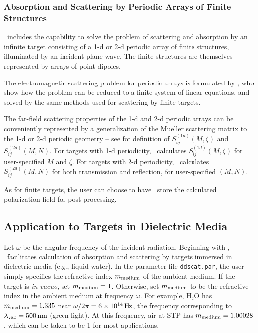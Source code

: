 {%

\subsubsection{ Absorption and Scattering by Periodic Arrays of Finite 
               Structures}

\ddscatv\ includes the capability to solve the problem of scattering and 
absorption by an infinite target consisting of a 1-d or 2-d periodic array of 
finite structures, illuminated by an incident plane wave.  
The finite structures are themselves represented by arrays of point dipoles.

The electromagnetic scattering problem for periodic arrays is formulated by 
\citet{Draine+Flatau_2008a}, 
who show how the problem can be reduced to a finite system of linear 
equations, and solved by the same methods used for scattering by finite 
targets.

The far-field scattering properties of the 1-d and 2-d periodic arrays can be
conveniently represented by a generalization of the Mueller scattering matrix 
to the 1-d or 2-d periodic geometry -- see \citet{Draine+Flatau_2008a} for 
definition of $S_{ij}^{(1d)}(M,\zeta)$ and $S_{ij}^{(2d)}(M,N)$.
For targets with 1-d periodicity, \ddscatv\ calculates 
$S_{ij}^{(1d)}(M,\zeta)$ for user-specified $M$ and $\zeta$.
For targets with 2-d periodicity, \ddscatv\ calculates
$S_{ij}^{(2d)}(M,N)$ for both transmission and reflection, for user-specified
$(M,N)$.

As for finite targets, the user can choose to have \ddscatv\ store the 
calculated polarization field for post-processing.  

\subsection{ Application to Targets in Dielectric Media}
	\label{sec:target_in_medium}}

Let $\omega$ be the angular frequency of the incident radiation.
Beginning with
\ddscatseventwo, \ddscat\ facilitates calculation of absorption and scattering
by targets immersed in dielectric media (e.g., liquid water).
In the parameter file {\tt ddscat.par}, the user simply specifies
the refractive index $m_{\rm medium}$ of the ambient medium.
If the target is {\it in vacuo}, set $m_{\rm medium}=1$.
Otherwise, set $m_{\rm medium}$ to be the refractive index in the
ambient medium at frequency $\omega$.
For example, H$_2$O has $m_{\rm medium}=1.335$ near $\omega/2\pi=6\times10^{14}\,{\rm Hz}$,
the frequency corresponding to $\lambda_{\rm vac}=500\,{\rm nm}$ (green light).
At this frequency, air at STP has $m_{\rm medium}=1.00028$,
which can be taken to be 1 for most applications.

